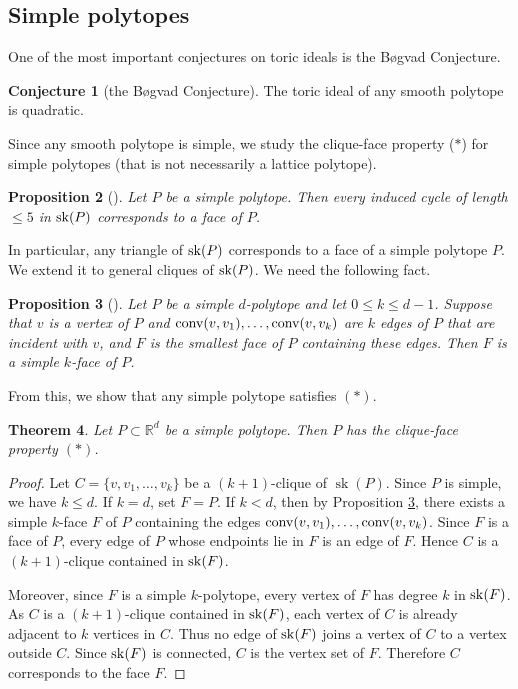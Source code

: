 \documentclass[12pt]{amsart}
\newtheorem{thm}{Theorem} [section]
\newtheorem{prop}[thm]{Proposition}
\theoremstyle{definition}
\newtheorem{conjecture}[thm]{Conjecture}
\numberwithin{thm}{section}
\numberwithin{equation}{section}
\def\NZQ{\mathbb}               %
\def\RR{{\NZQ R}}
\begin{document}
\subsection{Simple polytopes}

One of the most important conjectures on toric ideals is the B{\o}gvad Conjecture.

\begin{conjecture}[the B{\o}gvad Conjecture]
The toric ideal of any smooth polytope is quadratic.
\end{conjecture}

Since any smooth polytope is simple, we study the clique-face property ($*$) for 
simple polytopes (that is not necessarily a lattice polytope).

\begin{prop}[{\cite[Theorem 3.6.6]{PGbook}}]
Let $P$ be a simple polytope.
    Then every induced cycle of length $\le 5$
    in ${\rm sk}(P)$ corresponds to a face of $P$.
\end{prop}

In particular, any triangle of ${\rm sk}(P)$ corresponds to a face of a simple polytope $P$.   
We extend it to general cliques of ${\rm sk}(P)$.
We need the following fact.



\begin{prop}[{\cite[Theorem 2.8.6]{PGbook}}]
\label{ItsAFace}
Let $P$ be a simple $d$-polytope and let $0 \le k \le d-1$.
Suppose that $v$ is a vertex of $P$ and ${\rm conv}(v,v_1),\ldots,{\rm conv}(v,v_k)$ are $k$ edges of $P$ that are incident with $v$,
and $F$ is the smallest face of $P$ containing these edges.
    Then $F$ is a simple $k$-face of $P$.
\end{prop}

From this, we show that any simple polytope satisfies $(*)$.


\begin{thm}\label{simple_is_OK}
Let $P \subset \RR^d$ be a simple polytope.
Then \(P\) has the clique-face property \((*)\).
\end{thm}

\begin{proof}
Let \(C=\{v,v_1,\ldots,v_k\}\) be a \((k+1)\)-clique of \(\operatorname{sk}(P)\).
Since \(P\) is simple, we have \(k\le d\). If \(k=d\), set \(F=P\).
If \(k<d\), then by Proposition \ref{ItsAFace}, there exists a simple \(k\)-face \(F\)
of \(P\) containing the edges
${\rm conv}(v,v_1),\ldots,{\rm conv}(v,v_k)$.
Since \(F\) is a face of \(P\), every edge of \(P\) whose endpoints lie in
\(F\) is an edge of \(F\). Hence \(C\) is a \((k+1)\)-clique contained in
\({\rm sk}(F)\).

Moreover, since \(F\) is a simple \(k\)-polytope, every vertex of \(F\)
has degree \(k\) in \({\rm sk}(F)\). As \(C\) is a
\((k+1)\)-clique contained in \({\rm sk}(F)\), each vertex of
\(C\) is already adjacent to \(k\) vertices in \(C\). Thus no edge of
\({\rm sk}(F)\) joins a vertex of \(C\) to a vertex outside
\(C\). Since \({\rm sk}(F)\) is connected, \(C\) is the vertex
set of \(F\). Therefore \(C\) corresponds to the face \(F\).
\end{proof}
\end{document}
